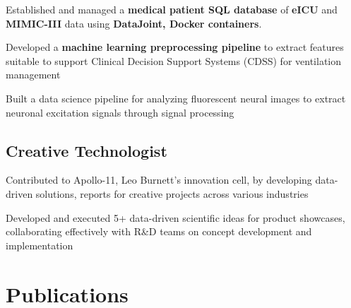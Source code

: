 \documentclass[letterpaper]{deedy-resume} %
\begin{document}
\begin{minipage}[t]{0.62\textwidth}
\begin{tightitemize}
{\begin{tightitemize}
                \item Established and managed a {\bf medical patient SQL database} of {\bf eICU} and {\bf MIMIC-III} data using {\bf DataJoint, Docker containers}.
                \item Developed a {\bf machine learning preprocessing pipeline} to extract features suitable to support Clinical Decision Support Systems (CDSS) for ventilation management
            \end{tightitemize}
        }
    \item{ 
        \vspace{\topsep}
            \begin{tightitemize}
                \item Built a data science pipeline for analyzing fluorescent neural images to extract neuronal excitation signals through signal processing
            \end{tightitemize}
        }
\end{tightitemize}

\sectionspace %
\subsection{Creative Technologist}
\begin{tightitemize}
    \item Contributed to Apollo-11, Leo Burnett's innovation cell, by developing data-driven solutions, reports for creative projects across various industries
    \item Developed and executed 5+ data-driven scientific ideas for product showcases, collaborating effectively with R\&D teams on concept development and implementation
\end{tightitemize}


\section{Publications}


\end{minipage}
\end{document}
